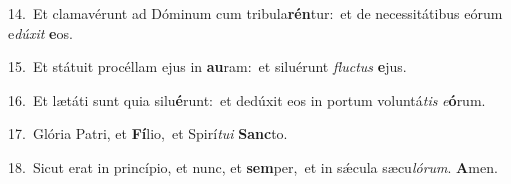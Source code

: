 {\numbfont\textcolor{\numbcolor}{14.}}~Et clamavérunt ad Dóminum cum tribula\-\textbf{rén}\-tur:~\star et de necessitátibus eórum e\-\textit{dú}\-\textit{xit} \textbf{e}\-os.\par
{\numbfont\textcolor{\numbcolor}{15.}}~Et státuit procéllam ejus in \textbf{au}\-ram:~\star et siluérunt \textit{fluc}\-\textit{tus} \textbf{e}\-jus.\par
{\numbfont\textcolor{\numbcolor}{16.}}~Et lætáti sunt quia silu\-\textbf{é}\-runt:~\star et dedúxit eos in portum voluntá\textit{tis} \textit{e}\-\textbf{ó}rum.\par
{\numbfont\textcolor{\numbcolor}{17.}}~Glória Patri, et \textbf{Fí}\-lio,~\star et Spirí\-\textit{tu}\-\textit{i} \textbf{Sanc}\-to.\par
{\numbfont\textcolor{\numbcolor}{18.}}~Sicut erat in princípio, et nunc, et \textbf{sem}\-per,~\star et in sǽcula sæcu\-\textit{ló}\-\textit{rum}. \textbf{A}\-men.\par
